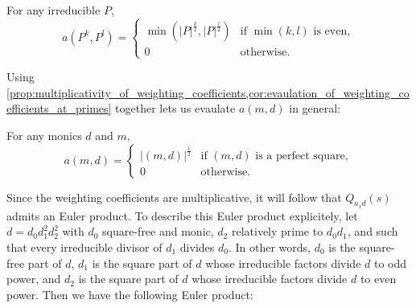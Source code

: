 \documentclass[12pt,reqno,oneside]{amsart}
\begin{document}
    \begin{corollary}\label{cor:evaulation_of_weighting_coefficients_at_primes}
        For any irreducible $P$,
        \[
            a(P^{k},P^{l}) = \begin{cases} \min\left(|P|^{\frac{k}{2}},|P|^{\frac{l}{2}}\right) & \text{if $\min(k,l)$ is even}, \\ 0 & \text{otherwise}. \end{cases}
        \]
    \end{corollary}

    Using \cref{prop:multiplicativity_of_weighting_coefficients,cor:evaulation_of_weighting_coefficients_at_primes} together lets us evaulate $a(m,d)$ in general:

    \begin{corollary}\label{cor:evaulation_of_weighting_coefficients_in_general}
        For any monics $d$ and $m$,
        \[
            a(m,d) = \begin{cases} |(m,d)|^{\frac{1}{2}} & \text{if $(m,d)$ is a perfect square}, \\ 0 & \text{otherwise}. \end{cases}
         \]
    \end{corollary}
    
    Since the weighting coefficients are multiplicative, it will follow that $Q_{a_{1}d}(s)$ admits an Euler product. To describe this Euler product explicitely, let $d = d_{0}d_{1}^{2}d_{2}^{2}$ with $d_{0}$ square-free and monic, $d_{2}$ relatively prime to $d_{0}d_{1}$, and such that every irreducible divisor of $d_{1}$ divides $d_{0}$. In other words, $d_{0}$ is the square-free part of $d$, $d_{1}$ is the square part of $d$ whose irreducible factors divide $d$ to odd power, and $d_{2}$ is the square part of $d$ whose irreducible factors divide $d$ to even power. Then we have the following Euler product:
\end{document}
